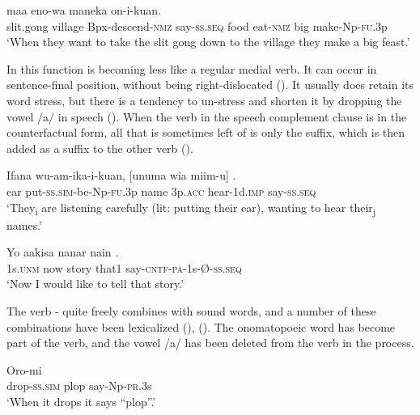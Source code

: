 \ea%
\label{ex:x1608}
  maa eno-wa maneka on-i-kuan.\\
slit.gong village Bpx-descend-\textsc{nmz} say-\textsc{ss}.\textsc{seq} food eat-\textsc{nmz} big make-Np-\textsc{fu}.3p\\
\glt`When they want to take the slit gong down to the village they make a big feast.'
\z

In this function  is becoming less like a regular medial verb. It can occur in sentence-final position, without being right-dislocated (). It usually does retain its word stress, but there is a tendency to un-stress and shorten it by dropping the vowel /a/ in speech (). When the verb in the speech complement clause is in the counterfactual form, all that is sometimes left of  is only the suffix, which is then added as a suffix to the other verb ().

\ea%
\label{ex:x1830}
\gll Ifana wu-am-ika-i-kuan, [unuma wia miim-u] \textstyleEmphasizedVernacularWords{-}.\\
ear put-\textsc{ss}.\textsc{sim}-be-Np-\textsc{fu}.3p name 3p.\textsc{acc} hear-1d.\textsc{imp} say-\textsc{ss}.\textsc{seq}\\
\glt`They\textsubscript{i} are listening carefully (lit: putting their ear), wanting to hear their\textsubscript{j} names.'
\z

\ea%
\label{ex:x1609}
\gll Yo aakisa nanar nain . \\
1s.\textsc{unm} now story that1 say-\textsc{cntf}-\textsc{pa}-1s-{\O}-\textsc{ss}.\textsc{seq}\\
\glt`Now I would like to tell that story.'
\z

The verb - quite freely combines with sound words, and a number of these combinations have been lexicalized (), (). The onomatopoeic word has become part of the verb, and the vowel /a/ has been deleted from the verb in the process.

\ea%
\label{ex:x330}
\gll Oro-mi   \\
drop-\textsc{ss}.\textsc{sim} plop say-Np-\textsc{pr}.3s \\
\glt`When it drops it says ``plop''.'
\z


